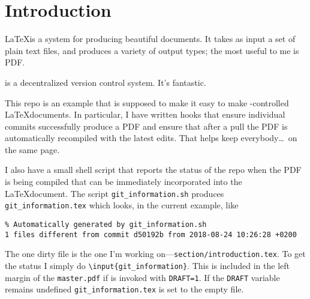 \section{Introduction}

\LaTeX is a system for producing beautiful documents.
It takes as input a set of plain text files, and produces a variety of output types; the most useful to me is PDF.

\git is a decentralized version control system.
It's fantastic.

This repo\cite{latex-base} is an example that is supposed to make it easy to make \git-controlled \LaTeX documents.
In particular, I have written \git hooks that ensure individual commits successfully produce a PDF and ensure that after a pull the PDF is automatically recompiled with the latest edits.
That helps keep everybody\ldots\ on the same page.

I also have a small shell script that reports the status of the repo when the PDF is being compiled that can be immediately incorporated into the \LaTeX document.
The script \texttt{git\_information.sh} produces \texttt{git\_information.tex} which looks, in the current example, like
\begin{verbatim}
% Automatically generated by git_information.sh
1 files different from commit d50192b from 2018-08-24 10:26:28 +0200
\end{verbatim}
The one dirty file is the one I'm working on---\texttt{section/introduction.tex}.
To get the \git status I simply do \texttt{\textbackslash{}input\{git\_information\}}.
This is included in the left margin of the \texttt{master.pdf} if \make is invoked with \texttt{DRAFT=1}.
If the \texttt{DRAFT} variable remains undefined \texttt{git\_information.tex} is set to the empty file.
